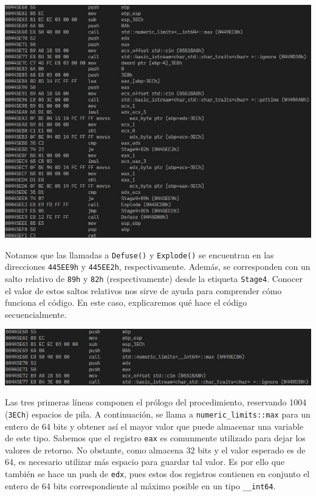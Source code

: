 \documentclass[11pt,a4paper]{article}
\begin{document}
\begin{center}
  \includegraphics[width=\textwidth]{Stage4/img1.png}
\end{center}

Notamos que las llamadas a \texttt{Defuse()} y \texttt{Explode()} se encuentran en las
direcciones \texttt{445EE9h} y \texttt{445EE2h}, respectivamente. Además, se corresponden
con un salto relativo de \texttt{89h} y \texttt{82h} (respectivamente) desde la etiqueta
\texttt{Stage4}. Conocer el valor de estos saltos relativos nos sirve de ayuda para comprender
cómo funciona el código. En este caso, explicaremos qué hace el código secuencialmente.

\begin{center}
  \includegraphics[width=\textwidth]{Stage4/img2.png}
\end{center}

Las tres primeras líneas componen el prólogo del procedimiento, reservando 1004 (\texttt{3ECh}) espacios de pila. A continuación, se llama a \texttt{numeric\_limits::max} para
un entero de 64 bits y obtener así el mayor valor que puede almacenar una variable de este tipo. Sabemos que el registro \texttt{eax} es
comunmente utilizado para dejar los valores de retorno. No obstante, como almacena 32 bits y el valor esperado es de 64, es necesario
utilizar más  espacio para guardar tal valor. Es por ello que también se hace un push de \texttt{edx}, pues estos dos registros contienen en
conjunto el entero de 64 bits correspondiente al máximo posible en un tipo \texttt{\_\_int64}.
\\
\end{document}
